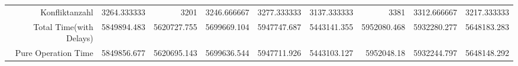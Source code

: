 \begin{landscape}
\begin{table}[htbp]
\begin{tabular}{rrrrrrrrr}
    Konfliktanzahl & 3264.333333 & 3201  & 3246.666667 & 3277.333333 & 3137.333333 & 3381  & 3312.666667 & 3217.333333 \\
    Total Time(with Delays) & 5849894.483 & 5620727.755 & 5699669.104 & 5947747.687 & 5443141.355 & 5952080.468 & 5932280.277 & 5648183.283 \\
    Pure Operation Time & 5849856.677 & 5620695.143 & 5699636.544 & 5947711.926 & 5443103.127 & 5952048.18 & 5932244.797 & 5648148.292 \\
    \bottomrule
    \end{tabular}%
  \label{tab:addlabel}%
\end{table}%

\end{landscape}


